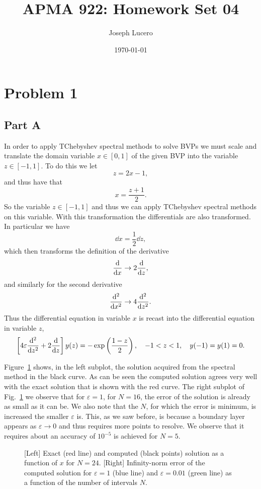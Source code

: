 \documentclass[12pt]{article}
\title{APMA 922: Homework Set 04}
\author{Joseph Lucero}
\date{\today}
\begin{document}
\maketitle

\section*{Problem 1}

\subsection*{Part A}

In order to apply TChebyshev spectral methods to solve BVPs we must scale and translate the domain variable $x \in [0,1]$ of the given BVP into the variable $z\in [-1,1]$. To do this we let $$z = 2x-1,$$ and thus have that $$x = \dfrac{z+1}{2}.$$ So the variable $z\in [-1,1]$ and thus we can apply TChebyshev spectral methods on this variable. With this transformation the differentials are also transformed. In particular we have $$\dd{x} = \dfrac{1}{2}\dd{z},$$ which then transforms the definition of the derivative $$ \dv{x}\to 2\dv{z},$$ and similarly for the second derivative $$\dv[2]{x}\to 4\dv[2]{z}.$$ Thus the differential equation in variable $x$ is recast into the differential equation in variable $z$, 
\begin{align}
	\left[4\varepsilon\dv[2]{z} + 2\dv{z}\right]y(z) = -\exp\left(\dfrac{1-z}{2}\right),\quad -1 < z < 1,\quad y(-1) = y(1) = 0.
\end{align}

Figure~\ref{fig:q1a_figure} shows, in the left subplot, the solution acquired from the spectral method in the black curve. As can be seen the computed solution agrees very well with the exact solution that is shown with the red curve. The right subplot of Fig.~\ref{fig:q1a_figure} we observe that for $\varepsilon=1$, for $N=16$, the error of the solution is already as small as it can be. We also note that the $N$, for which the error is minimum, is increased the smaller $\varepsilon$ is. This, as we saw before, is because a boundary layer appears as $\varepsilon\to 0$ and thus requires more points to resolve. We observe that it requires about an accuracy of $10^{-5}$ is achieved for $N=5$.

\begin{figure}[!h]
	\centering
	\caption{[Left] Exact (red line) and computed (black points) solution as a function of $x$ for $N=24$. [Right] Infinity-norm error of the computed solution for $\varepsilon=1$ (blue line) and $\varepsilon=0.01$ (green line) as a function of the number of intervals $N$.}
	\label{fig:q1a_figure}
\end{figure}
\end{document}
